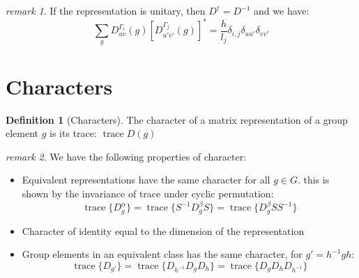 \documentclass{amsart}
\theoremstyle{remark}
\newtheorem*{remark}{remark}
\theoremstyle{remark}
\theoremstyle{definition}
\newtheorem*{definition}{Definition}
\DeclareMathOperator{\Tr}{trace}
\begin{document}
\begin{remark}
    If the representation is unitary, then $D^{\dagger} = D^{-1}$ and we have:
    \begin{equation*}
        \sum_g D^{\Gamma_i}_{uv}(g)\left[D^{\Gamma_j}_{u'v'}(g)\right]^* = \frac{h}{l_j} \delta_{i,j}\delta_{uu'}\delta_{vv'}
    \end{equation*}
\end{remark}

\vspace{10pt}
\section*{Characters}
\begin{definition}
    [Characters]
    The character of a matrix representation of a group element $g$ is its trace: $\Tr D(g)$
\end{definition}
\begin{remark}
We have the following properties of character:
\begin{itemize}
    \item Equivalent representations have the same character for all $g \in G$. this is shown by the 
        invariance of trace under cyclic permutation:
        \begin{equation*}
            \Tr\{ D^{\alpha}_g \} = \Tr \{S^{-1}D^{\beta}_gS\} = \Tr \{D^{\beta}_g S S^{-1} \}
        \end{equation*}
    \item Character of identity equal to the dimension of the representation
    \item Group elements in an equivalent class has the same character, for $g' = h^{-1}gh$:
    \begin{equation*}
        \Tr\{ D_{g'} \} = \Tr \{D_{h^{-1}} D_{g} D_{h}\} = \Tr \{D_{g} D_{h}D_{h^{-1}} \}
    \end{equation*}
\end{itemize}
\end{remark}

\vspace{10pt}
\end{document}
